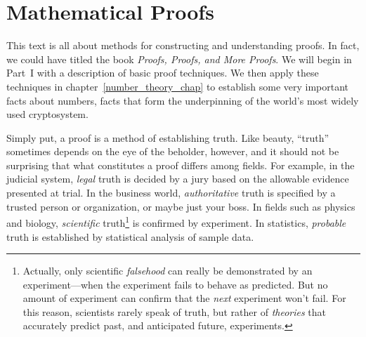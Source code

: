
\iffalse

\chapter{What is a Proof?}\label{proofs_chap}

\newtheorem{method}{Method}

\section{Introduction}

Proofs are the part of Math that Computer Science students

This is a Math text aimed at students of Computer Science, and the
topics we cover were selected because of their connection to Computer
Science.  
 for students to Computer Scientists need who mostly
chose not to be Math majors, even though they did just fine in High
School Math and introductory calculus.
\fi

\section*{Mathematical Proofs}

This text is all about methods for constructing and understanding
proofs.  In fact, we could have titled the book \emph{Proofs, Proofs,
and More Proofs}.  We will begin in Part~I with a description of basic
proof techniques.  We then apply these techniques in
chapter~\ref{number_theory_chap} to establish some very important
facts about numbers, facts that form the underpinning of the world's
most widely used cryptosystem.

Simply put, a proof is a method of establishing truth.  Like beauty,
``truth'' sometimes depends on the eye of the beholder, however, and
it should not be surprising that what constitutes a proof differs
among fields.  For example, in the judicial system, \emph{legal} truth
is decided by a jury based on the allowable evidence presented at
trial.  In the business world, \emph{authoritative} truth is specified
by a trusted person or organization, or maybe just your boss.  In
fields such as physics and biology, \emph{scientific}
truth\footnote{Actually, only scientific
\emph{falsehood} can really be demonstrated by an experiment---when
the experiment fails to behave as predicted.  But no amount of
experiment can confirm that the \emph{next} experiment won't fail.
For this reason, scientists rarely speak of truth, but rather
of \emph{theories} that accurately predict past, and anticipated
future, experiments.} is confirmed by experiment.  In
statistics, \emph{probable} truth is established by statistical
analysis of sample data.

